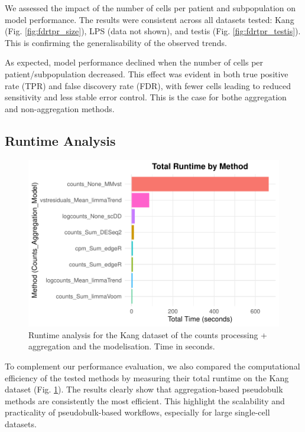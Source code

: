\documentclass[a4paper, 11pt, twocolumn]{article}
\begin{document}
\begin{multicols}{2}
We assessed the impact of the number of cells per patient and subpopulation on model performance. The results were consistent across all datasets tested: Kang (Fig. \ref{fig:fdrtpr_size}), LPS (data not shown), and testis (Fig. \ref{fig:fdrtpr_testis}). This is confirming the generalisability of the observed trends.

As expected, model performance declined when the number of cells per patient/subpopulation decreased. This effect was evident in both true positive rate (TPR) and false discovery rate (FDR), with fewer cells leading to reduced sensitivity and less stable error control. This is the case for bothe aggregation and non-aggregation methods.
	
\subsection{Runtime Analysis}

\begin{figure}[H]
	\centering
	\includegraphics[width=1\columnwidth]{figs/plot_runtime_Kang.pdf}
	\caption{{\footnotesize Runtime analysis for the Kang dataset of the counts processing + aggregation and the modelisation. Time in seconds.}}
	\label{fig:runtime}
\end{figure}

To complement our performance evaluation, we also compared the computational efficiency of the tested methods by measuring their total runtime on the Kang dataset (Fig. \ref{fig:runtime}). The results clearly show that aggregation-based pseudobulk methods are consistently the most efficient. This highlight the scalability and practicality of pseudobulk-based workflows, especially for large single-cell datasets.


\end{multicols}
\end{document}
